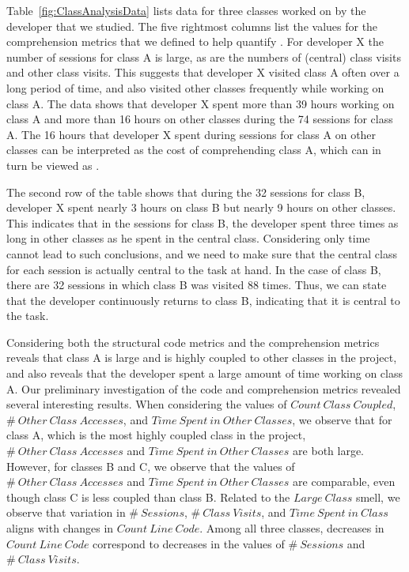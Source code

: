 Table~\ref{fig:ClassAnalysisData} lists data for three classes worked on by the developer that we studied. The five rightmost columns list the values for the comprehension metrics that we defined to help quantify \TD. For developer X the number of sessions for class A is large, as are the numbers of (central) class visits and other class visits. This suggests that developer X visited class A often over a long period of time, and also visited other classes frequently while working on class A. The data shows that developer X spent more than 39 hours working on class A and more than 16 hours on other classes during the 74 sessions for class A. The 16 hours that developer X spent during sessions for class A on other classes can be interpreted as the cost of comprehending class A, which can in turn be viewed as \TD.

The second row of the table shows that during the 32 sessions for class B, developer X spent nearly 3 hours on class B but nearly 9 hours on other classes. This indicates that in the sessions for class B, the developer spent three times as long in other classes as he spent in the central class. Considering only time cannot lead to such conclusions, and we need to make sure that the central class for each session is actually central to the task at hand. In the case of class B, there are 32 sessions in which class B was visited 88 times. Thus, we can state that the developer continuously returns to class B, indicating that it is central to the task. 


Considering both the structural code metrics and the comprehension metrics reveals that class A is large and is highly coupled to other classes in the project, and also reveals that the developer spent a large amount of time working on class A. Our preliminary investigation of the code and comprehension metrics revealed several interesting results. When considering the values of $Count~Class~Coupled$, $\#~Other~Class~Accesses$, and $Time~Spent~in~Other~Classes$, we observe that for class A, which is the most highly coupled class in the project, $\#~Other~Class~Accesses$ and $Time~Spent~in~Other~Classes$ are both large. However, for classes B and C, we observe that the values of $\#~Other~Class~Accesses$ and $Time~Spent~in~Other~Classes$ are comparable, even though class C is less coupled than class B. Related to the $Large~Class$ smell, we observe that variation in $\#~Sessions$, $\#~Class~Visits$, and $Time~Spent~in~Class$ aligns with changes in $Count~Line~Code$. Among all three classes, decreases in $Count~Line~Code$ correspond to decreases in the values of $\#~Sessions$ and $\#~Class~Visits$. 

